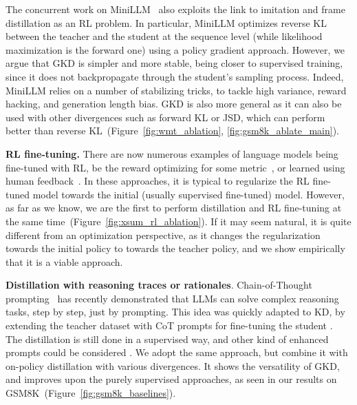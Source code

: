 \documentclass{article} %
\begin{document}

The concurrent work on MiniLLM~\citep{gu2023knowledge} also exploits the link to imitation and frame distillation as an RL problem. In particular, MiniLLM optimizes reverse KL between the teacher and the student at the sequence level (while likelihood maximization is the forward one) using a policy gradient approach. 
However, we argue that GKD is simpler and more stable, being closer to supervised training, since it does not backpropagate through the student's sampling process. Indeed, MiniLLM relies on a number of stabilizing tricks, to tackle high variance, reward hacking, and generation length bias. GKD is also more general as it can also be used with other divergences such as forward KL or JSD, which can perform better than reverse KL~(Figure~\ref{fig:wmt_ablation}, \ref{fig:gsm8k_ablate_main}). %

\textbf{RL fine-tuning.} There are now numerous examples of language models being fine-tuned with RL, be the reward optimizing for some metric~\citep{wu2018study}, or learned using human feedback~\citep{ouyang2022training}. In these approaches, it is typical to regularize the RL fine-tuned model towards the initial (usually supervised fine-tuned) model. However, as far as we know, we are the first to perform distillation and RL fine-tuning at the same time~(Figure~\ref{fig:xsum_rl_ablation}). If it may seem natural, it is quite different from an optimization perspective, as it changes the regularization towards the initial policy to towards the teacher policy, and we show empirically that it is a viable approach.


\textbf{Distillation with reasoning traces or rationales}. Chain-of-Thought prompting~\citep{nye2021show, wei2022chain} has recently demonstrated that LLMs can solve complex reasoning tasks, step by step, just by prompting. This idea was quickly adapted to KD, by extending the teacher dataset with CoT prompts for fine-tuning the student \citep{magister2022teaching,ho2022large,hsieh2023distilling}. The distillation is still done in a supervised way, and other kind of enhanced prompts could be considered \citep{li2022explanations, mukherjee2023orca}. We adopt the same approach, but combine it with on-policy distillation with various divergences. %
It shows the versatility of GKD, and improves upon the purely supervised approaches, as seen in our results on GSM8K~(Figure~\ref{fig:gsm8k_baselines}).
\end{document}
